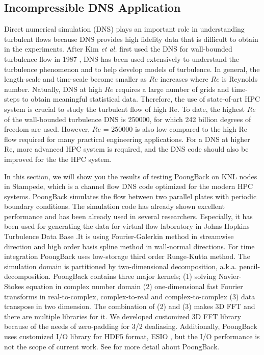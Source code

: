 \subsection{Incompressible DNS Application}
\label{sec:dns_full}

Direct numerical simulation (DNS) plays an important role in understanding turbulent flows because DNS provides high fidelity data that is difficult to obtain in the experiments. After Kim {\it et al.} first used the DNS for wall-bounded turbulence flow in 1987 \cite{Kim:1987ub}, DNS has been used extensively to understand the turbulence phenomenon and to help develop models of turbulence. In general, the length-scale and time-scale become smaller as $Re$ increases where $Re$ is Reynolds number. Natually, DNS at high $Re$ requires a large number of grids and time-steps to obtain meaningful statistical data. Therefore, the use of state-of-art HPC system is crucial to study the turbulent flow of high Re. To date, the highest $Re$ of the wall-bounded turbulence DNS is 250000, for which 242 billion degrees of freedom are used. \cite{Lee:2015er} However, $Re$ = 250000 is also low compared to the high Re flow required for many practical engineering applications. For a DNS at higher Re, more advanced HPC system is required, and the DNS code should also be improved for the the HPC system.

In this section, we will show you the results of testing PoongBack on KNL nodes in Stampede, which is a channel flow DNS code optimized for the modern HPC systems. PoongBack simulates the flow between two parallel plates with periodic boundary conditions. The simulation code has already shown excellent performance and has been already used in several researchers. \cite{Lee:2013kv} Especially, it has been used for generating the data for virtual flow laboratory in Johns Hopkins Turbulence Data Base \cite{Graham:2015ha}.It is using Fourier-Galerkin method in streamwise direction and high order basis spline method in wall-normal directions. For time integration PoongBack uses low-storage third order Runge-Kutta method. The simulation domain is partitioned by two-dimensional decomposition, a.k.a. pencil-decomposition. PoongBack contains three major kernels; (1) solving Navier-Stokes equation in complex number domain (2) one-dimensional fast Fourier transforms in real-to-complex, complex-to-real and complex-to-complex (3) data transpose in two dimension. The combination of (2) and (3) makes 3D FFT and there are multiple libraries for it. We developed customized 3D FFT library because of the needs of zero-padding for 3/2 dealiasing. Additionally, PoongBack uses customized I/O library for HDF5 format, ESIO \cite{Lee:2014ta}, but the I/O performance is not the scope of current work. See \cite{Lee:2013kv,Lee:2014ta} for more detail about PoongBack.  

